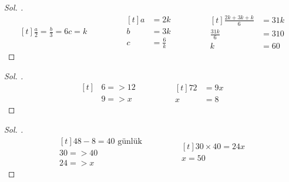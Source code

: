 \documentclass{article}
\theoremstyle{mytheoremstyle}
\theoremstyle{mytheoremstyle}
\theoremstyle{myproblemstyle}
\begin{document}
\begin{proof}[\textit{ Sol. }]
  \begin{equation*}
    \begin{aligned}[t]
      \frac{a}{2} = \frac{b}{3} = 6c = k
    \end{aligned}
    \qquad\qquad
    \begin{aligned}[t]
      a &= 2k\\
      b &= 3k\\
      c &= \frac{6}{k}
    \end{aligned}
    \qquad\qquad
    \begin{aligned}[t]
      \frac{2k + 3k + k}{6} &= 31k\\
      \frac{31k}{6} &= 310\\
      k &= 60
    \end{aligned}
  \end{equation*}
\end{proof}

\begin{problem}
\end{problem}

\begin{proof}[\textit{ Sol. }]
  \begin{equation*}
    \begin{aligned}[t]
      &6 => 12\\
      &9 => x
    \end{aligned}
    \qquad\qquad
    \begin{aligned}[t]
      72 &= 9x\\
      x &= 8
    \end{aligned}
  \end{equation*}
\end{proof}

\begin{problem}
\end{problem}

\begin{proof}[\textit{ Sol. }]
  \begin{equation*}
    \begin{aligned}[t]
      48 - 8 = 40 \text{ günlük}\\
      30 => 40\\
      24 => x
    \end{aligned}
    \qquad\qquad
    \begin{aligned}[t]
      30 \times 40 = 24x\\
      x = 50
    \end{aligned}
  \end{equation*}
\end{proof}
\end{document}
